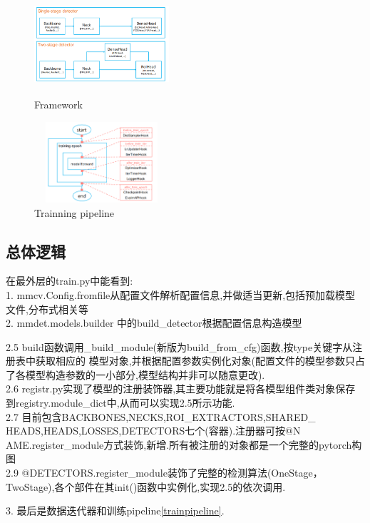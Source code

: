 \documentclass[UTF8]{ctexart}
\begin{document}
\begin{figure}[htbp]
	\centering
	\begin{minipage}[t]{0.48\textwidth}
	\centering
	\includegraphics[width=5cm, height=3cm]{./pic/mmdetect.png}
	\caption{ Framework }
	\end{minipage}
	\begin{minipage}[t]{0.48\textwidth}
	\centering
	\includegraphics[width=5cm,height=3cm]{./pic/mmdetect_pipe.png}
	\caption{Trainning pipeline}
	\label{trainpipe_pic}
	\end{minipage}
\end{figure}

\subsection{总体逻辑}
在最外层的train.py中能看到:\\
1. mmcv.Config.fromfile从配置文件解析配置信息,并做适当更新,包括预加载模型文件,分布式相关等\\
2. mmdet.models.builder 中的build\_detector根据配置信息构造模型

\begin{adjustwidth}{0.5cm}{0cm}

2.5 build函数调用\_build\_module(新版为build\_from\_cfg)函数,按type关键字从注册表中获取相应的
模型对象,并根据配置参数实例化对象(配置文件的模型参数只占了各模型构造参数的一小部分,模型结构并非可以随意更改).\\
2.6 registr.py实现了模型的注册装饰器,其主要功能就是将各模型组件类对象保存到registry.module\_dict中,从而可以实现2.5所示功能.\\
2.7 目前包含BACKBONES,NECKS,ROI\_EXTRACTORS,SHARED\_\\
HEADS,HEADS,LOSSES,DETECTORS七个(容器).注册器可按@N
AME.register\_module方式装饰,新增.所有被注册的对象都是一个完整的pytorch构图\\
2.9 @DETECTORS.register\_module装饰了完整的检测算法(OneStage，TwoStage),各个部件在其init()函数中实例化,实现2.5的依次调用.
\end{adjustwidth}
3. 最后是数据迭代器和训练pipeline\ref{trainpipeline}.
\end{document}
